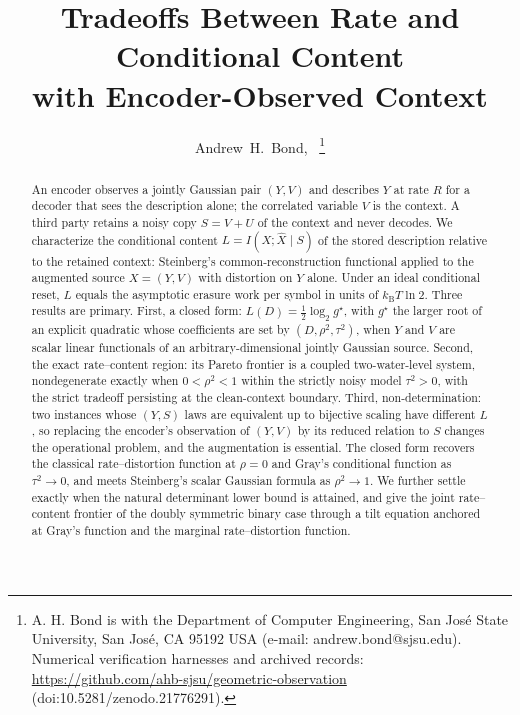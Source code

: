 ﻿\documentclass[11pt,onecolumn]{IEEEtran}
\newcommand{\hX}{\widehat{X}}
\newcommand{\kb}{k_{\mathrm{B}}}
\begin{document}
\title{Tradeoffs Between Rate and Conditional Content\\ with Encoder-Observed Context}

\author{Andrew~H.~Bond,~%
\thanks{A. H. Bond is with the Department of Computer Engineering, San Jos\'e
State University, San Jos\'e, CA 95192 USA (e-mail: andrew.bond@sjsu.edu).
Numerical verification harnesses and archived records:
\url{https://github.com/ahb-sjsu/geometric-observation} (doi:10.5281/zenodo.21776291).}}


\maketitle

\begin{abstract}
An encoder observes a jointly Gaussian pair $(Y,V)$ and describes $Y$ at rate
$R$ for a decoder that sees the description alone; the correlated variable
$V$ is the context. A third party retains a noisy copy $S=V+U$ of the
context and never decodes. We characterize the conditional content
$L=I(X;\hX\mid S)$ of the stored description relative to the retained
context: Steinberg's common-reconstruction functional applied to the
augmented source $X=(Y,V)$ with distortion on $Y$ alone. Under an ideal
conditional reset, $L$ equals the asymptotic erasure work per symbol in
units of $\kb T\ln 2$. Three results are primary. First, a closed form:
$L(D)=\tfrac12\log_2 g^\star$, with $g^\star$ the larger root of an
explicit quadratic whose coefficients are set by $(D,\rho^2,\tau^2)$, when
$Y$ and $V$ are scalar linear functionals of an arbitrary-dimensional
jointly Gaussian source. Second, the exact rate--content region: its
Pareto frontier is a coupled two-water-level system, nondegenerate exactly
when $0<\rho^2<1$ within the strictly noisy model $\tau^2>0$, with the
strict tradeoff persisting at the clean-context boundary. Third,
non-determination: two instances whose $(Y,S)$ laws are equivalent up to
bijective scaling have different $L$, so replacing the encoder's
observation of $(Y,V)$ by its reduced relation to $S$ changes the
operational problem, and the augmentation is essential. The closed form
recovers the classical rate--distortion function at $\rho=0$ and Gray's
conditional function as $\tau^2\to0$, and meets Steinberg's scalar
Gaussian formula as $\rho^2\to1$. We further settle exactly when the
natural determinant lower bound is attained, and give the joint
rate--content frontier of the doubly symmetric binary case through a tilt
equation anchored at Gray's function and the marginal rate--distortion
function.
\end{abstract}
\end{document}

